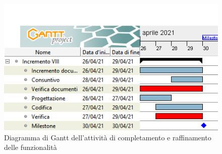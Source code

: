 \begin{figure}[h]
	\centering
	\includegraphics[width=12cm]{Images/GanttPianificazioneRaffinamentoFunzionalita.PNG}
	\caption{Diagramma di Gantt dell'attività di completamento e raffinamento delle funzionalità}
\end{figure}